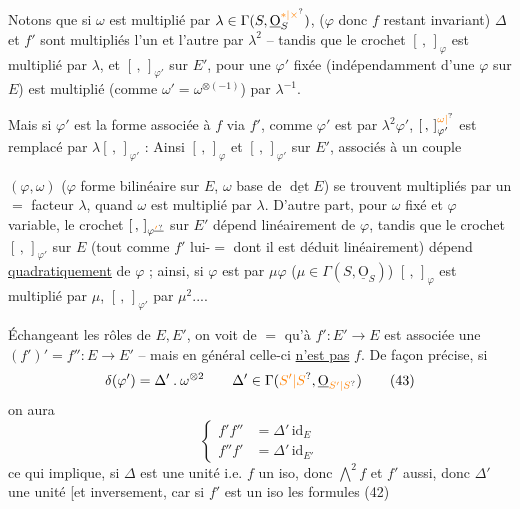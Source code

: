 Notons que si $\omega$ est multiplié par $\lambda\in\Gamma(S,\underline{\mathrm O}_S^{\unsure{*|\times}})$, ($\varphi$ donc $f$ restant invariant) $\Delta$ et $f'$ sont multipliés l'un et l'autre par $\lambda^2$ -- tandis que le crochet $[\, ,\,]_\varphi$  est multiplié par $\lambda$, et  $[\, ,\,]_{\varphi'}$ sur $E'$, pour  une $\varphi'$ fixée (indépendamment d'une $\varphi$ sur $E$) est multiplié (comme $\omega'=\omega^{\otimes(-1)}$) par $\lambda^{-1}$.

Mais si $\varphi'$ est la forme associée à $f$ via $f'$, comme  $\varphi'$ est  par $\lambda^2\varphi'$, $[\, ,\,]_{\varphi'}^{\unsure{\omega|}}$ est remplacé par $\lambda[\, ,\,]_{\varphi'}$ : Ainsi $[\, ,\,]_\varphi$  et $[\, ,\,]_{\varphi'}$ sur $E'$, associés à un couple

$(\varphi,\omega)$ ($\varphi$ forme bilinéaire sur $E$, $\omega$ base de $\underline{\det} E$) se trouvent multipliés par un $=$ facteur $\lambda$, quand $\omega$ est multiplié par $\lambda$. D'autre part, pour $\omega$ fixé et $\varphi$ variable, le crochet $[\, ,\,]_{\varphi\deleted{\unsure{'}}}$ sur $E'$ dépend linéairement de $\varphi$, tandis que le crochet $[\, ,\,]_{\varphi'}$ sur $E$ (tout comme $f'$ lui-$=$ dont il est déduit linéairement) dépend \uline{quadratiquement} de $\varphi$ ; ainsi, si $\varphi$ est  par $\mu\varphi$ ($\mu\in\Gamma(S,\underline{\mathrm O}_S)$) $[\, ,\,]_\varphi$ est multiplié par $\mu$, $[\, ,\,]_{\varphi'}$ par $\mu^2$....

Échangeant les rôles de $E,E'$, on voit de $=$ qu'à $f':E'\to E$ est associée une $(f')'=f'':E\to E'$ -- mais en général celle-ci \uline{n'est pas} $f$. De façon précise, si 
\[
 \delta(\varphi')=\Delta'\mathbin{.}\omega^{\otimes2}\qquad
 \Delta'\in\Gamma(\unsure{S'|S},\underline{\mathrm O}_{\unsure{S'|S}}) \tag*{(43)}
\]
on aura
\[
 \left\{\begin{aligned}
 f'f''&=\Delta'\,\mathrm{id}_E\\
 f''f'&=\Delta'\,\mathrm{id}_{E'}
 \end{aligned}\right. \tag*{(44)}
\]
ce qui  implique, si $\Delta$ est une unité i.e. $f$ un iso, donc $\bigwedge^2f$ et $f'$ aussi, donc $\Delta'$ une unité [et inversement, car si $f'$ est un iso les formules (42)

